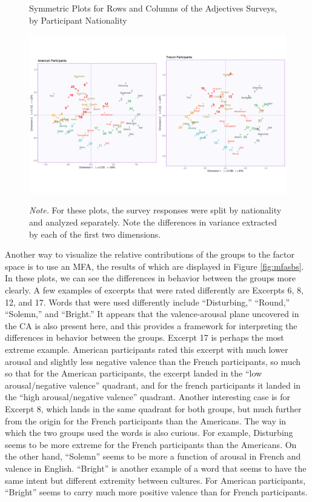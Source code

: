 \documentclass[
  english,
  man,floatsintext]{apa6}
\begin{document}
\begin{figure}   
  \centering  
  \caption{Symmetric Plots for Rows and Columns of the Adjectives Surveys, by Participant Nationality}
    \includegraphics{./Music-Descriptor-Space_files/figure-latex/factormapsA.png}
  \label{fig:factormapsA}
  \caption*{\footnotesize \textit{Note.}  For these plots, the survey responses were split by nationality and analyzed separately. Note the differences in variance extracted by each of the first two dimensions.}
\end{figure}

Another way to visualize the relative contributions of the groups to the factor space is to use an MFA, the results of which are displayed in Figure \ref{fig:mfasbs}. In these plots, we can see the differences in behavior between the groups more clearly. A few examples of excerpts that were rated differently are Excerpts 6, 8, 12, and 17. Words that were used differently include ``Disturbing,'' ``Round,'' ``Solemn,'' and ``Bright.'' It appears that the valence-arousal plane uncovered in the CA is also present here, and this provides a framework for interpreting the differences in behavior between the groups. Excerpt 17 is perhaps the most extreme example. American participants rated this excerpt with much lower arousal and slightly less negative valence than the French participants, so much so that for the American participants, the excerpt landed in the ``low arousal/negative valence'' quadrant, and for the french participants it landed in the ``high arousal/negative valence'' quadrant. Another interesting case is for Excerpt 8, which lands in the same quadrant for both groups, but much further from the origin for the French participants than the Americans. The way in which the two groups used the words is also curious. For example, Disturbing seems to be more extreme for the French participants than the Americans. On the other hand, ``Solemn'' seems to be more a function of arousal in French and valence in English. ``Bright'' is another example of a word that seems to have the same intent but different extremity between cultures. For American participants, ``Bright'' seems to carry much more positive valence than for French participants.
\end{document}
